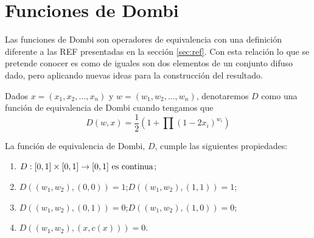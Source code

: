\documentclass[main]{subfiles}
\begin{document}
\section{Funciones de Dombi}\label{sec:dombi}
Las funciones de Dombi \cite{art:dombi} son operadores de equivalencia con una definición diferente a las REF presentadas en la sección \ref{sec:ref}. Con esta relación lo que se pretende conocer es como de iguales son dos elementos de un conjunto difuso dado, pero aplicando nuevas ideas para la construcción del resultado.
\begin{definition}\label{def:dombi}
Dados $x=(x_1, x_2, \dots,x_n)$ y $w=(w_1,w_2,\dots,w_n)$, denotaremos $D$ como una función de equivalencia de Dombi cuando tengamos que
$$D(w,x)=\frac{1}{2}\left(1+\prod(1-2x_{i})^{w_{i}}\right)$$
\end{definition}
\begin{lemma}\label{def:propiedadesdombi}
La función de equivalencia de Dombi, $D$, cumple las siguientes propiedades:
\begin{enumerate}
	\item $D:[0,1]\times[0,1] \rightarrow [0,1] \text{ es continua}$;
	\item $D((w_1,w_2),(0,0)) = 1$;\quad$D((w_1,w_2),(1,1)) = 1$;
	\item $D((w_1,w_2),(0,1)) = 0$;\quad$D((w_1,w_2),(1,0)) = 0$;
	\item $D((w_1,w_2),(x,c(x))) = 0$.
\end{enumerate}
\end{lemma}
\end{document}
